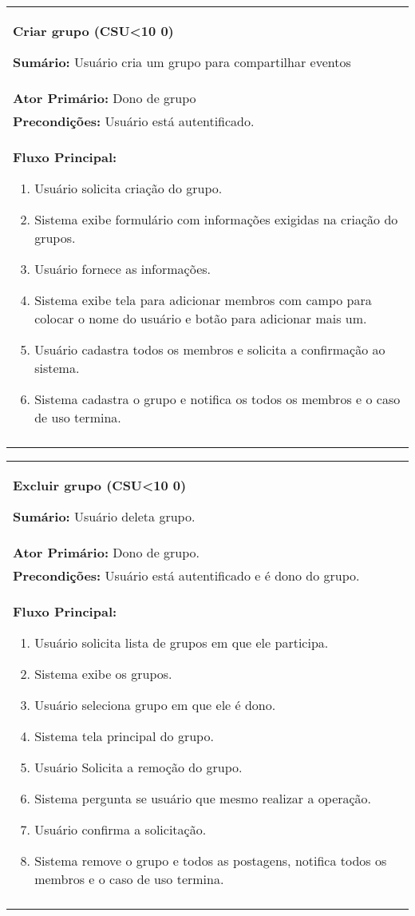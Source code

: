 \documentclass{article}
\newcounter{cscounter}
\newcommand{\sumario}[1] {\textbf{Sumário:} #1\\ }
\newcommand{\ator}[1] {\textbf{Ator Primário:} #1\\}
\newcommand{\precond}[1] {\textbf{Precondições:} #1\\}
\newcommand{\fluxo}{\textbf{Fluxo Principal:}}
\newenvironment{casosdeuso}[1]
{
 \stepcounter{cscounter}
 \begin{center}
 \begin{tabular}{|p{\textwidth}|}
 \hline
 \begin{center}
 \large \textbf{#1 (CSU\ifnum\value{cscounter}<10 0\fi\arabic{cscounter})}
 \end{center}
}
{ 
 \\\\\hline
 \end{tabular} 
 \end{center}
}
\begin{document}
\begin{casosdeuso}{Criar grupo}
 \sumario{Usuário cria um grupo para compartilhar eventos}
 \ator{Dono de grupo}
 \precond{Usuário está autentificado.}
\fluxo
\begin{enumerate}[itemsep=0mm]
 \item Usuário solicita criação do grupo.
 \item Sistema exibe formulário com informações exigidas na criação do grupos.
 \item Usuário fornece as informações.
 \item Sistema exibe tela para adicionar membros com campo para colocar o nome do usuário e botão para adicionar mais um.
 \item Usuário cadastra todos os membros e solicita a confirmação ao sistema.
 \item Sistema cadastra o grupo e notifica os todos os membros e o caso de uso termina.
\end{enumerate}
\end{casosdeuso}

\begin{casosdeuso}{Excluir grupo}
 \sumario{Usuário deleta grupo.}
 \ator{Dono de grupo.}
 \precond{Usuário está autentificado e é dono do grupo.}
\fluxo
\begin{enumerate}[itemsep=0mm]
 \item Usuário solicita lista de grupos em que ele participa.
 \item Sistema exibe os grupos.
 \item Usuário seleciona grupo em que ele é dono.
 \item Sistema tela principal do grupo.
 \item Usuário Solicita a remoção do grupo.
 \item Sistema pergunta se usuário que mesmo realizar a operação.
 \item Usuário confirma a solicitação.
 \item Sistema remove o grupo e todos as postagens, notifica todos os membros e o caso de uso termina.
\end{enumerate}
\end{casosdeuso}
 
\end{document}
